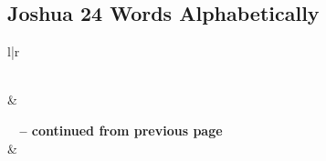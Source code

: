 

\subsection{Joshua 24 Words Alphabetically}


\normalsize
 
\begin{center}
\begin{longtable}{l|r}
\caption[Joshua 24 Words Alphabetically]{Joshua 24 Words Alphabetically}\label{table:WordsAlphabetically for Joshua 24} \\
\hline {} &  \\ \hline 
\endfirsthead
 
{{\bfseries \tablename\ \thetable{} -- continued from previous page}} \\  
\hline {} &  \\ \hline 
\endhead
 

\end{longtable}
\end{center}
